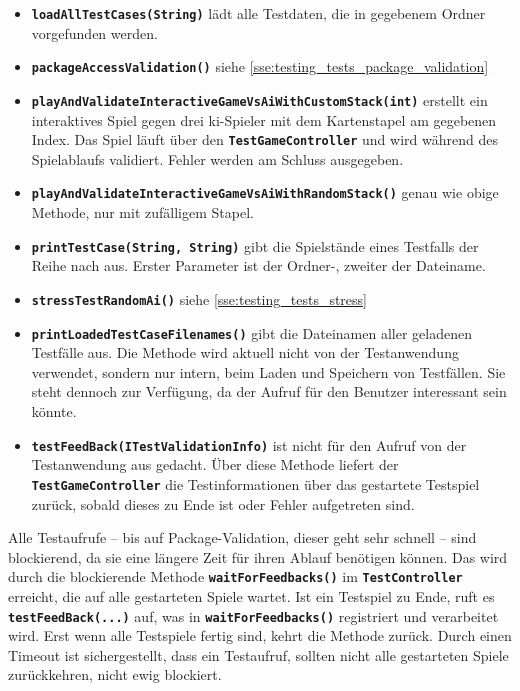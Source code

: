 \documentclass[
							a4paper, 
							11pt, 
							openany, 
							liststotoc,
							parskip=half, 
   							headings=normal
						]{scrreprt}
\begin{document}
{\begin{itemize}
	\item \textbf{\texttt{loadAllTestCases(String)}} lädt alle Testdaten, die in gegebenem Ordner vorgefunden werden.
	\item \textbf{\texttt{packageAccessValidation()}} siehe \autoref{sse:testing_tests_package_validation}
	\item \textbf{\texttt{playAndValidateInteractiveGameVsAiWithCustomStack(int)}} erstellt ein interaktives Spiel gegen drei \acs{ki}-Spieler mit dem Kartenstapel am gegebenen Index. Das Spiel läuft über den \textbf{\texttt{TestGameController}} und wird während des Spielablaufs validiert. Fehler werden am Schluss ausgegeben.
	\item \textbf{\texttt{playAndValidateInteractiveGameVsAiWithRandomStack()}}
genau wie obige Methode, nur mit zufälligem Stapel.
	\item \textbf{\texttt{printTestCase(String, String)}} gibt die Spielstände eines Testfalls der Reihe nach aus. Erster Parameter ist der Ordner-, zweiter der Dateiname.
	\item \textbf{\texttt{stressTestRandomAi()}} siehe \autoref{sse:testing_tests_stress}
	\item \textbf{\texttt{printLoadedTestCaseFilenames()}} gibt die Dateinamen aller geladenen Testfälle aus. Die Methode wird aktuell nicht von der Testanwendung verwendet, sondern nur intern, beim Laden und Speichern von Testfällen. Sie steht dennoch zur Verfügung, da der Aufruf für den Benutzer interessant sein könnte.
	\item \textbf{\texttt{testFeedBack(ITestValidationInfo)}} ist nicht für den Aufruf von der Testanwendung aus gedacht. Über diese Methode liefert der \textbf{\texttt{TestGameController}} die Testinformationen über das gestartete Testspiel zurück, sobald dieses zu Ende ist oder Fehler aufgetreten sind.
\end{itemize}

Alle Testaufrufe -- bis auf Package-Validation, dieser geht sehr schnell -- sind blockierend, da sie eine längere Zeit für ihren Ablauf benötigen können.                                         \newline
Das wird durch die blockierende Methode \textbf{\texttt{waitForFeedbacks()}} im \textbf{\texttt{TestController}} erreicht, die auf alle gestarteten Spiele wartet. Ist ein Testspiel zu Ende, ruft es \textbf{\texttt{test\-Fe\-ed\-Back(...)}} auf, was in \textbf{\texttt{waitForFeedbacks()}} registriert und verarbeitet wird. Erst wenn alle Testspiele fertig sind, kehrt die Methode zurück.\newline
Durch einen Timeout ist sichergestellt, dass ein Testaufruf, sollten nicht alle gestarteten Spiele zurückkehren, nicht ewig blockiert.

}
\end{document}
